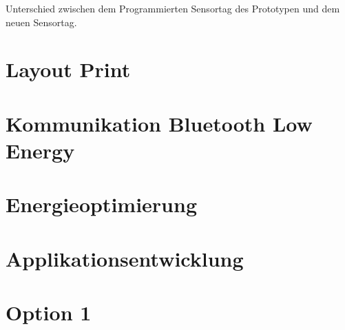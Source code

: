 Unterschied zwischen dem Programmierten Sensortag des Prototypen und dem neuen Sensortag.




\section{Layout Print}

\section{Kommunikation Bluetooth Low Energy}

\section{Energieoptimierung}



\section{Applikationsentwicklung}

\section{Option 1}







